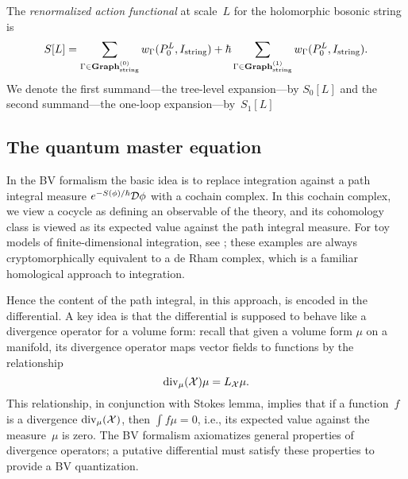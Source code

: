 \begin{dfn}
The {\em renormalized action functional} at scale~$L$ for the holomorphic bosonic string is
\[
S[L] = \sum_{\Gamma \in {\bf Graph}_{\rm string}^{(0)}} w_{\Gamma}(P_{0}^L,I_{\rm string}) + \hbar\sum_{\Gamma \in {\bf Graph}_{\rm string}^{(1)}} w_{\Gamma}(P_{0}^L,I_{\rm string}).
\]
We denote the first summand---the tree-level expansion---by $S_0[L]$ 
and the second summand---the one-loop expansion---by~$S_1[L]$
\end{dfn}



\subsection{The quantum master equation}
\label{subsec: QME}

In the BV formalism the basic idea is to replace integration against a path integral measure $e^{-S(\phi)/\hbar} \mathcal D \phi$ with a cochain complex.
In this cochain complex, we view a cocycle as defining an observable of the theory,
and its cohomology class is viewed as its expected value against the path integral measure.
For toy models of finite-dimensional integration, see \cite{};
these examples are always cryptomorphically equivalent to a de Rham complex,
which is a familiar homological approach to integration.

Hence the content of the path integral, in this approach, is encoded in the differential. 
A key idea is that the differential is supposed to behave like a divergence operator for a volume form:
recall that given a volume form $\mu$ on a manifold, 
its divergence operator maps vector fields to functions by the relationship
\[
{\rm div}_\mu({\mathcal X}) \mu = L_{\mathcal X} \mu.
\] 
This relationship, in conjunction with Stokes lemma, 
implies that if a function~$f$ is a divergence ${\rm div}_\mu({\mathcal X})$,
then $\int f \mu = 0$,
i.e., its expected value against the measure~$\mu$ is zero.
The BV formalism axiomatizes general properties of divergence operators;
a putative differential must satisfy these properties to provide a BV quantization.

